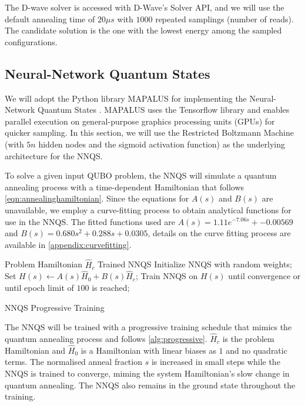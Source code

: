 The D-wave solver is accessed with D-Wave's Solver API, and we will use the default annealing time of $20\mu s$ with $1000$ repeated samplings (number of reads). The candidate solution is the one with the lowest energy among the sampled configurations.

\subsection{Neural-Network Quantum States}
We will adopt the Python library MAPALUS for implementing the Neural-Network Quantum States \cite{b25}. MAPALUS uses the Tensorflow library and enables parallel execution on general-purpose graphics processing units (GPUs) for quicker sampling. In this section, we will use the Restricted Boltzmann Machine (with $5n$ hidden nodes and the sigmoid activation function) as the underlying architecture for the NNQS. 

To solve a given input QUBO problem, the NNQS will simulate a quantum annealing process with a time-dependent Hamiltonian that follows \autoref{eqn:annealinghamiltonian}. Since the equations for $A(s)$ and $B(s)$ are unavailable, we employ a curve-fitting process to obtain analytical functions for use in the NNQS. The fitted functions used are $A(s) = 1.11e^{-7.06s} + -0.00569$ and $B(s)= 0.680s^2 + 0.288s + 0.0305$, details on the curve fitting process are available in \autoref{appendix:curvefitting}.

\begin{algorithm}
    \begin{algorithmic}
    \Require Problem Hamiltonian $\hat{H}_c$
    \Ensure Trained NNQS
    \State Initialize NNQS with random weights;
    \State Set $H(s) \leftarrow A(s)\hat{H}_0 + B(s)\hat{H}_c$;
    \State Train NNQS on $H(s)$ until convergence or until epoch limit of $100$ is reached;
    \EndFor
    \end{algorithmic}
    \caption{NNQS Progressive Training}
    \label{alg:progressive}
\end{algorithm}

The NNQS will be trained with a progressive training schedule that mimics the quantum annealing process and follows \autoref{alg:progressive}. $\hat{H}_c$ is the problem Hamiltonian and $\hat{H}_0$ is a Hamiltonian with linear biases as $1$ and no quadratic terms. The normalised anneal fraction $s$ is increased in small steps while the NNQS is trained to converge, miming the system Hamiltonian's slow change in quantum annealing. The NNQS also remains in the ground state throughout the training. 

